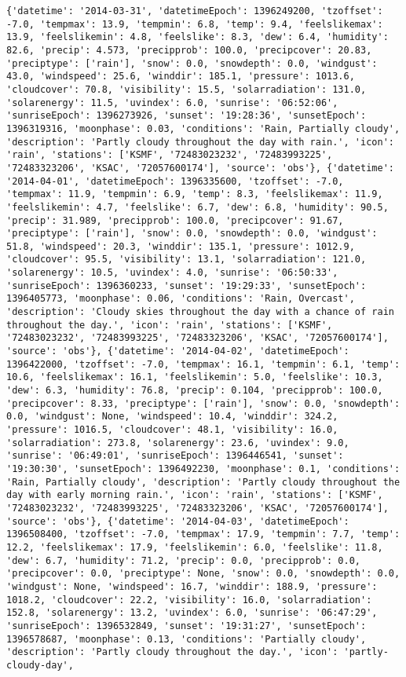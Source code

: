 \documentclass[
  letterpaper,
  DIV=11,
  numbers=noendperiod]{scrartcl}
\begin{document}
\begin{verbatim}
{'datetime': '2014-03-31', 'datetimeEpoch': 1396249200, 'tzoffset': -7.0, 'tempmax': 13.9, 'tempmin': 6.8, 'temp': 9.4, 'feelslikemax': 13.9, 'feelslikemin': 4.8, 'feelslike': 8.3, 'dew': 6.4, 'humidity': 82.6, 'precip': 4.573, 'precipprob': 100.0, 'precipcover': 20.83, 'preciptype': ['rain'], 'snow': 0.0, 'snowdepth': 0.0, 'windgust': 43.0, 'windspeed': 25.6, 'winddir': 185.1, 'pressure': 1013.6, 'cloudcover': 70.8, 'visibility': 15.5, 'solarradiation': 131.0, 'solarenergy': 11.5, 'uvindex': 6.0, 'sunrise': '06:52:06', 'sunriseEpoch': 1396273926, 'sunset': '19:28:36', 'sunsetEpoch': 1396319316, 'moonphase': 0.03, 'conditions': 'Rain, Partially cloudy', 'description': 'Partly cloudy throughout the day with rain.', 'icon': 'rain', 'stations': ['KSMF', '72483023232', '72483993225', '72483323206', 'KSAC', '72057600174'], 'source': 'obs'}, {'datetime': '2014-04-01', 'datetimeEpoch': 1396335600, 'tzoffset': -7.0, 'tempmax': 11.9, 'tempmin': 6.9, 'temp': 8.3, 'feelslikemax': 11.9, 'feelslikemin': 4.7, 'feelslike': 6.7, 'dew': 6.8, 'humidity': 90.5, 'precip': 31.989, 'precipprob': 100.0, 'precipcover': 91.67, 'preciptype': ['rain'], 'snow': 0.0, 'snowdepth': 0.0, 'windgust': 51.8, 'windspeed': 20.3, 'winddir': 135.1, 'pressure': 1012.9, 'cloudcover': 95.5, 'visibility': 13.1, 'solarradiation': 121.0, 'solarenergy': 10.5, 'uvindex': 4.0, 'sunrise': '06:50:33', 'sunriseEpoch': 1396360233, 'sunset': '19:29:33', 'sunsetEpoch': 1396405773, 'moonphase': 0.06, 'conditions': 'Rain, Overcast', 'description': 'Cloudy skies throughout the day with a chance of rain throughout the day.', 'icon': 'rain', 'stations': ['KSMF', '72483023232', '72483993225', '72483323206', 'KSAC', '72057600174'], 'source': 'obs'}, {'datetime': '2014-04-02', 'datetimeEpoch': 1396422000, 'tzoffset': -7.0, 'tempmax': 16.1, 'tempmin': 6.1, 'temp': 10.6, 'feelslikemax': 16.1, 'feelslikemin': 5.0, 'feelslike': 10.3, 'dew': 6.3, 'humidity': 76.8, 'precip': 0.104, 'precipprob': 100.0, 'precipcover': 8.33, 'preciptype': ['rain'], 'snow': 0.0, 'snowdepth': 0.0, 'windgust': None, 'windspeed': 10.4, 'winddir': 324.2, 'pressure': 1016.5, 'cloudcover': 48.1, 'visibility': 16.0, 'solarradiation': 273.8, 'solarenergy': 23.6, 'uvindex': 9.0, 'sunrise': '06:49:01', 'sunriseEpoch': 1396446541, 'sunset': '19:30:30', 'sunsetEpoch': 1396492230, 'moonphase': 0.1, 'conditions': 'Rain, Partially cloudy', 'description': 'Partly cloudy throughout the day with early morning rain.', 'icon': 'rain', 'stations': ['KSMF', '72483023232', '72483993225', '72483323206', 'KSAC', '72057600174'], 'source': 'obs'}, {'datetime': '2014-04-03', 'datetimeEpoch': 1396508400, 'tzoffset': -7.0, 'tempmax': 17.9, 'tempmin': 7.7, 'temp': 12.2, 'feelslikemax': 17.9, 'feelslikemin': 6.0, 'feelslike': 11.8, 'dew': 6.7, 'humidity': 71.2, 'precip': 0.0, 'precipprob': 0.0, 'precipcover': 0.0, 'preciptype': None, 'snow': 0.0, 'snowdepth': 0.0, 'windgust': None, 'windspeed': 16.7, 'winddir': 188.9, 'pressure': 1018.2, 'cloudcover': 22.2, 'visibility': 16.0, 'solarradiation': 152.8, 'solarenergy': 13.2, 'uvindex': 6.0, 'sunrise': '06:47:29', 'sunriseEpoch': 1396532849, 'sunset': '19:31:27', 'sunsetEpoch': 1396578687, 'moonphase': 0.13, 'conditions': 'Partially cloudy', 'description': 'Partly cloudy throughout the day.', 'icon': 'partly-cloudy-day', 
\end{verbatim}
\end{document}
